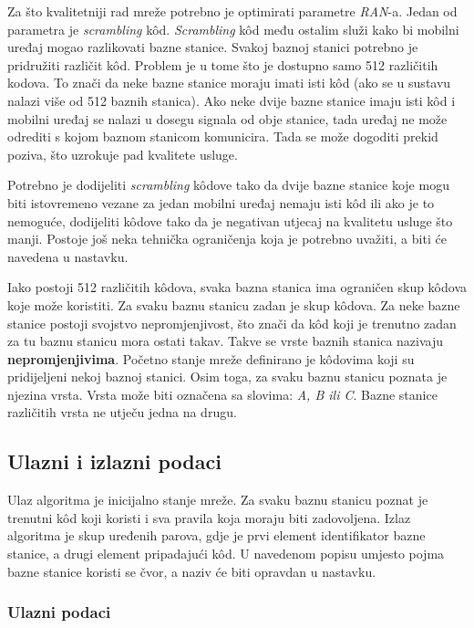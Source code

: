 \documentclass[times, utf8, diplomski, numeric]{fer}
\begin{document}
Za što kvalitetniji rad mreže potrebno je optimirati parametre \emph{RAN}-a. Jedan od parametra je \emph{scrambling} k\^{o}d. \emph{Scrambling} k\^{o}d među ostalim služi kako bi mobilni uređaj mogao razlikovati bazne stanice. Svakoj baznoj stanici potrebno je pridružiti različit k\^{o}d. Problem je u tome što je dostupno samo 512 različitih kodova. To znači da neke bazne stanice moraju imati isti k\^{o}d (ako se u sustavu nalazi više od 512 baznih stanica). Ako neke dvije bazne stanice imaju isti k\^{o}d i mobilni uređaj se nalazi u dosegu signala od obje stanice, tada uređaj ne može odrediti s kojom baznom stanicom komunicira. Tada se može dogoditi prekid poziva, što uzrokuje pad kvalitete usluge.

Potrebno je dodijeliti \emph{scrambling} k\^{o}dove tako da dvije bazne stanice koje mogu biti istovremeno vezane za jedan mobilni uređaj nemaju isti k\^{o}d ili ako je to nemoguće, dodijeliti k\^{o}dove tako da je negativan utjecaj na kvalitetu usluge što manji. Postoje još neka tehnička ograničenja koja je potrebno uvažiti, a biti će navedena u nastavku.

Iako postoji 512 različitih k\^{o}dova, svaka bazna stanica ima ograničen skup k\^{o}dova koje može koristiti. Za svaku baznu stanicu zadan je skup k\^{o}dova. Za neke bazne stanice postoji svojstvo nepromjenjivost, što znači da k\^{o}d koji je trenutno zadan za tu baznu stanicu mora ostati takav. Takve se vrste baznih stanica nazivaju \textbf{nepromjenjivima}. Početno stanje mreže definirano je k\^{o}dovima koji su pridijeljeni nekoj baznoj stanici. Osim toga, za svaku baznu stanicu poznata je njezina vrsta. Vrsta može biti označena sa slovima: \emph{A, B ili C}. Bazne stanice različitih vrsta ne utječu jedna na drugu.

\subsection{Ulazni i izlazni podaci}

Ulaz algoritma je inicijalno stanje mreže. Za svaku baznu stanicu poznat je trenutni k\^{o}d koji koristi i sva pravila koja moraju biti zadovoljena. Izlaz algoritma je skup uređenih parova, gdje je prvi element identifikator bazne stanice, a drugi element pripadajući k\^{o}d. U navedenom popisu umjesto pojma bazne stanice koristi se čvor, a naziv će biti opravdan u nastavku.

\subsubsection{Ulazni podaci}
\end{document}
